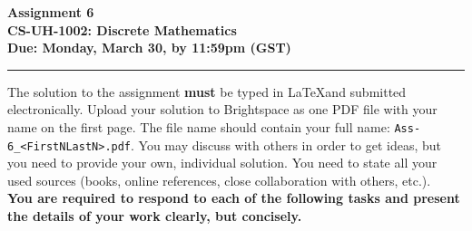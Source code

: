 \documentclass[11pt,twoside,a4paper]{article}
\theoremstyle{exercise}
\newtheorem{exercise}{Task}
\newcommand{\myline}{\rule{\textwidth}{0.6pt}}
\begin{document}
\begin{center}
  {\Large \bf Assignment 6}\\[0.7ex]
  {\large \bf CS-UH-1002: Discrete Mathematics}\\[2ex]
  {\large \bf Due: Monday, March 30, by 11:59pm (GST)}\\[2ex]
\end{center}

\vspace*{-3ex}
\myline


The solution to the assignment \textbf{must} be typed in \LaTeX and submitted electronically. Upload your solution to Brightspace as one PDF file with your name on the first page. The file name should contain your full name: \texttt{Ass-6\_<FirstNLastN>.pdf}.  You may discuss with others in order to get ideas, but you need to provide your own, individual solution. You need to state all your used sources (books, online references, close collaboration with others, etc.).\\

\textbf{You are required to respond to each of the following tasks and present the details of your work clearly, but concisely.}





\end{document}
